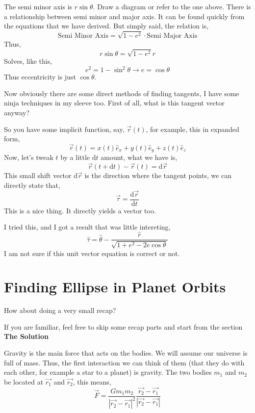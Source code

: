 \documentclass[11pt,a4paper]{article}
\begin{document}
The semi minor axis is $r \sin \theta$. Draw a diagram or refer to the one above. There is a relationship between semi minor and major axis. It can be found quickly from the equations that we have derived. But simply said, the relation is,
\[ 
\text{Semi Minor Axis} = \sqrt{1 - e^2}  \cdot \text{Semi Major Axis}
\]
Thus,
\[ 
r \sin \theta = \sqrt{1 - e^2}  r
\]
Solves, like this,
\[ 
e^2 = 1 - \sin ^2 \theta \to \boxed{  e = \cos \theta}
\]
Thus eccentricity is just $\cos \theta$. 

Now obviously there are some direct methods of finding tangents, I have some ninja techniques in my sleeve too. First of all, what is this tangent vector anyway?

So you have some implicit function, say, $\vec{r}\left( t \right) $, for example, this in expanded form,
\[ 
    \vec{r} \left( t \right)  = x\left( t \right)  \hat{e}_x +
    y\left( t \right) \hat{e}_y +
    z\left( t \right) \hat{e}_z
\]
Now, let's tweak $t$ by a little $\mathrm{d} t$ amount, what we have is,
\[ 
    \vec{r}\left( t + \mathrm{d} t \right)  - \vec{r}\left( t  \right) = \mathrm{d} \vec{r}
\] 
This small shift vector $\mathrm{d} \vec{r}$ is the direction where the tangent points, we can directly state that,
\[ 
\vec{\tau} = \frac{\mathrm{d} \vec{r}}{\mathrm{d} t}
\]
This is a nice thing. It directly yields a vector too. 

I tried this, and I got a result that was little intereting,
\[ 
    \hat{\tau} = \hat{\theta} - \frac{\hat{r}}{\sqrt{1 + e^2 - 2 e \cos \theta} }
\] I am not sure if this unit vector equation is correct or not.

















\section{ Finding Ellipse in Planet Orbits }
How about doing a very small recap? 

If you are familiar, feel free to skip some recap parts and start from the section \textbf{The Solution}


Gravity is the main force that acts on the bodies. We will assume our universe is full of mass. Thus, the first interaction we can think of them (that they do with each other, for example a star to a planet) is gravity. The two bodies $m_1$ and $m_2$ be located at $\vec{r_1}$ and $\vec{r_2}$, this means, 
\[ 
    \vec{F} = \frac{Gm_1m_2}{|\vec{r_2} - \vec{r_1}|^2} \frac{\vec{r_2} - \vec{r_1}}{| \vec{r_2} - \vec{r_1}|}
\]
\end{document}
